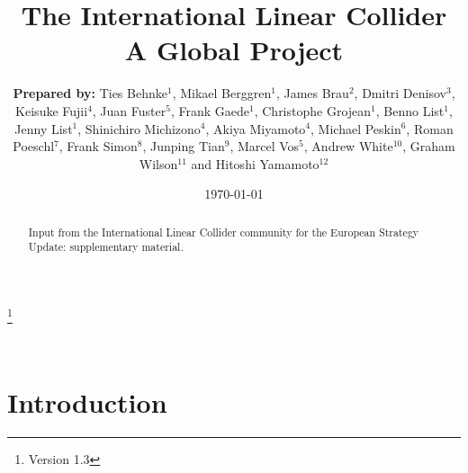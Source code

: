 \documentclass[%
reprint,
nofootinbib,
 amsmath,amssymb,
 aps,
]{revtex4-1}
\begin{document}

\title{The International Linear Collider \\ A Global Project}%
\thanks{Version 1.3}%

\author{\textbf{Prepared by:}
Ties Behnke$^1$, Mikael Berggren$^1$, James Brau$^2$, Dmitri Denisov$^{3}$, Keisuke Fujii$^{4}$, Juan Fuster$^{5}$, Frank Gaede$^{1}$, Christophe Grojean$^{1}$, Benno List$^{1}$, Jenny List$^{1}$, Shinichiro Michizono$^{4}$, Akiya Miyamoto$^{4}$, Michael Peskin$^{6}$, Roman Poeschl$^{7}$, Frank Simon$^{8}$, Junping Tian$^{9}$, Marcel Vos$^{5}$, Andrew White$^{10}$, Graham Wilson$^{11}$ and Hitoshi Yamamoto$^{12}$  }


%


\date{\today}%

\begin{abstract}
Input from the International Linear Collider community for the European Strategy Update: supplementary material.

\end{abstract}

 
\maketitle

\tableofcontents

\clearpage
\newpage
\mbox{~}


\section{\label{sec:intro}Introduction}
   
\end{document}
